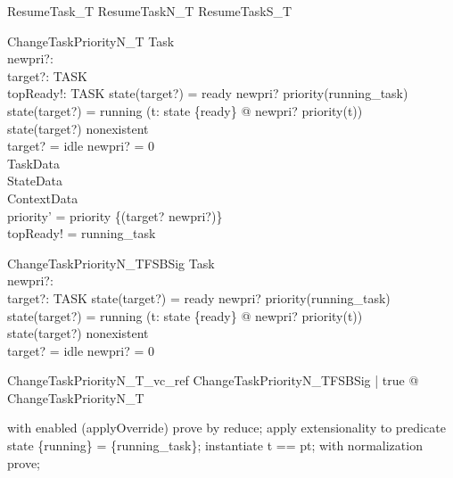 \documentclass[a4paper, 12pt]{article}
\begin{document}
\begin{zed}
ResumeTask\_T  ResumeTaskN\_T \lor ResumeTaskS\_T
\end{zed}


\begin{schema}{ChangeTaskPriorityN\_T}
  \Delta Task\\
  newpri?: \nat \\
  target?: TASK\\
  topReady!: TASK
\where
  state(target?) = ready \implies  newpri? \leq  priority(running\_task)\\
  state(target?) = running \implies  (\forall  t: state \inv  \limg  \{ready\} \rimg  @ newpri? \geq  priority(t))\\
  state(target?) \neq  nonexistent\\
  target? = idle \implies  newpri? = 0\\
  \Xi TaskData\\
  \Xi StateData\\
  \Xi ContextData\\
  priority' = priority \oplus  \{(target? \mapsto  newpri?)\}\\
  topReady! = running\_task
\end{schema}

\begin{schema}{ChangeTaskPriorityN\_TFSBSig}
  Task\\
  newpri?: \nat \\
  target?: TASK
\where
  state(target?) = ready \implies  newpri? \leq  priority(running\_task)\\
  state(target?) = running \implies  (\forall  t: state \inv  \limg  \{ready\} \rimg  @ newpri? \geq  priority(t))\\
  state(target?) \neq  nonexistent\\
  target? = idle \implies  newpri? = 0
\end{schema}

\begin{theorem}{ChangeTaskPriorityN\_T\_vc\_ref}
\forall  ChangeTaskPriorityN\_TFSBSig | true @ \pre  ChangeTaskPriorityN\_T
\end{theorem}

\begin{zproof}
with enabled (applyOverride) prove by reduce;
apply extensionality to predicate state \inv  \limg  \{running\} \rimg  = \{running\_task\};
instantiate t == pt;
with normalization prove;
\end{zproof}
\end{document}
